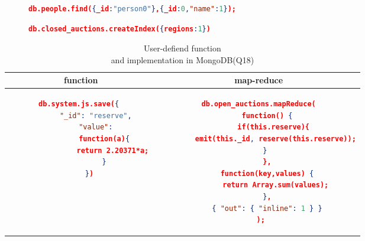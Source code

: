 \begin{figure}
\centering
\begin{lstlisting}[language=JSON, caption=XMark Query Q1 in MongoDB, label=mongo-xmark-q1]
		db.people.find({_id:"person0"},{_id:0,"name":1});
\end{lstlisting}
\centering
\begin{lstlisting}[language=JSON, caption=MongoDB secondary Index, label=mongodb-create-index]
          db.closed_auctions.createIndex({regions:1})
\end{lstlisting}
\end{figure}


\begin{longtable}[hbt]{c|c}
    \caption{ User-defiend function \\and implementation in MongoDB(Q18)}
    \label{tbl:mongodb-q18}\\
    {function } & {map-reduce}\\
	\hline
\begin{minipage}{.3\textwidth}
\begin{lstlisting}[language=JSON,basicstyle =\scriptsize]
    db.system.js.save({ 
        "_id": "reserve", 
        "value": 
            function(a){ 
                return 2.20371*a; 
            } 
    })
\end{lstlisting}
\end{minipage} &
\begin{minipage}{.4\textwidth}
\begin{lstlisting}[language=JSON,basicstyle =\scriptsize]
db.open_auctions.mapReduce(
    function() {
       if(this.reserve){
        emit(this._id, reserve(this.reserve));
       }    
    },
    function(key,values) {
        return Array.sum(values);
    },
    { "out": { "inline": 1 } }
 );
\end{lstlisting}
\end{minipage}
\end{longtable}


